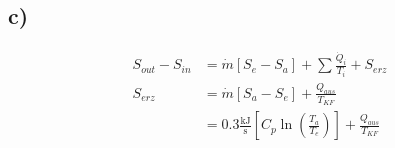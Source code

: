 

\subsection*{c)}
\begin{align*}
S_{out} - S_{in} &= \dot{m} [S_e - S_a] + \sum \frac{\dot{Q}_i}{T_i} + S_{erz} \\
S_{erz} &= \dot{m} [S_a - S_e] + \frac{Q_{aus}}{T_{KF}} \\
&= 0.3 \frac{\text{kJ}}{\text{s}} \left[ C_p \ln \left( \frac{T_a}{T_e} \right) \right] + \frac{Q_{aus}}{T_{KF}}
\end{align*}